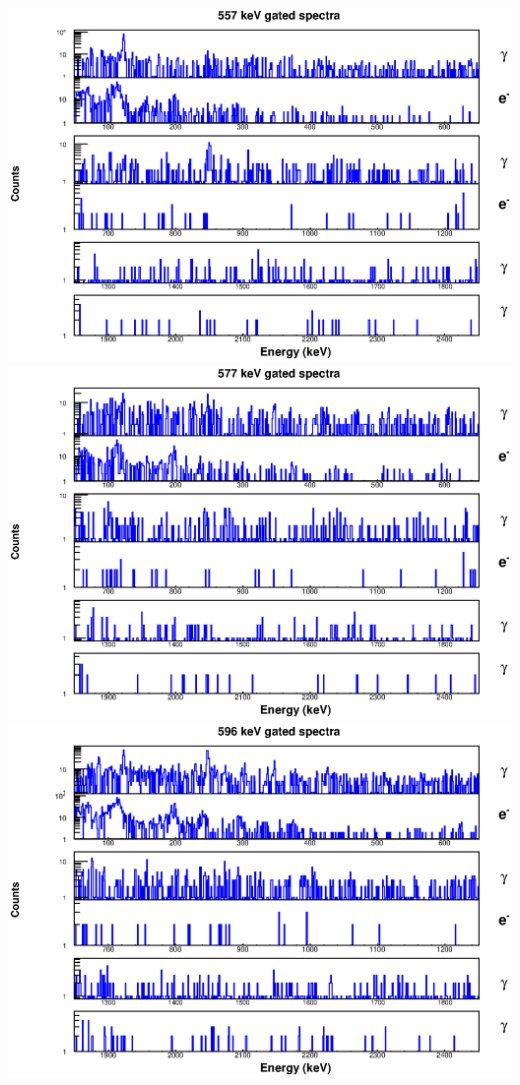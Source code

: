 \includegraphics[scale=0.8]{154Gd_Appendix/557_combined.eps}
\includegraphics[scale=0.8]{154Gd_Appendix/577_combined.eps}
\includegraphics[scale=0.8]{154Gd_Appendix/596_combined.eps}
